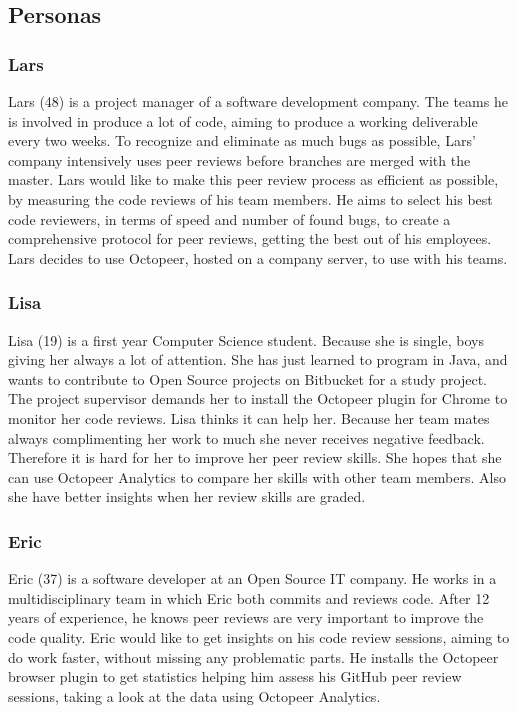 \documentclass{article}
\begin{document}
\subsection{Personas} \label{section:personas}
\subsubsection{Lars}  \label{persona:lars}
Lars (48) is a project manager of a software development company. The teams he is involved in produce a lot of code, aiming to produce a working deliverable every two weeks. To recognize and eliminate as much bugs as possible, Lars' company intensively uses peer reviews before branches are merged with the master. Lars would like to make this peer review process as efficient as possible, by measuring the code reviews of his team members. He aims to select his best code reviewers, in terms of speed and number of found bugs, to create a comprehensive protocol for peer reviews, getting the best out of his employees. Lars decides to use Octopeer, hosted on a company server, to use with his teams.

\subsubsection{Lisa}
Lisa (19) is a first year Computer Science student. Because she is single, boys giving her always a lot of attention. She has just learned to program in Java, and wants to contribute to Open Source projects on Bitbucket for a study project. The project supervisor demands her to install the Octopeer plugin for Chrome to monitor her code reviews. Lisa thinks it can help her. Because her team mates always complimenting her work to much she never receives negative feedback. Therefore it is hard for her to improve her peer review skills. She hopes that she can use Octopeer Analytics to compare her skills with other team members. Also she have better insights when her review skills are graded.

\subsubsection{Eric}
Eric (37) is a software developer at an Open Source IT company. He works in a multidisciplinary team in which Eric both commits and reviews code. After 12 years of experience, he knows peer reviews are very important to improve the code quality. Eric would like to get insights on his code review sessions, aiming to do work faster, without missing any problematic parts. He installs the Octopeer browser plugin to get statistics helping him assess his GitHub peer review sessions, taking a look at the data using Octopeer Analytics.
\end{document}
